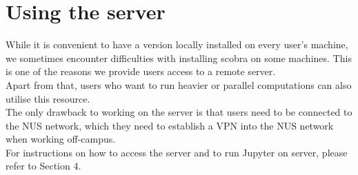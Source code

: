 
\section{Using the server}

While it is convenient to have a version locally installed on every user's machine, we sometimes encounter difficulties with installing scobra on some machines. This is one of the reasons we provide users access to a remote server. \\

Apart from that, users who want to run heavier or parallel computations can also utilise this resource. \\ 

The only drawback to working on the server is that users need to be connected to the NUS network, which they need to establish a VPN into the NUS network when working off-campus.\\ 

For instructions on how to access the server and to run Jupyter on server, please refer to Section 4. 

